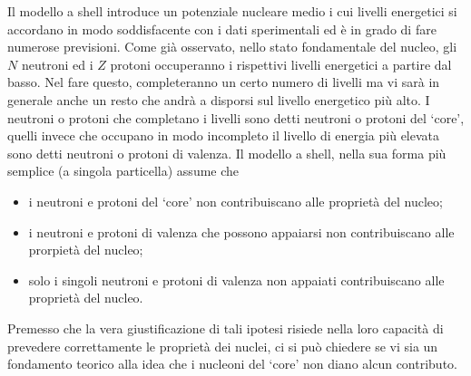 Il modello a shell introduce un potenziale nucleare medio i cui livelli energetici si accordano in modo soddisfacente con i dati sperimentali ed è in grado di fare numerose previsioni.
Come già osservato, nello stato fondamentale del nucleo, gli $N$ neutroni ed i $Z$ protoni occuperanno i rispettivi livelli energetici a partire dal basso. Nel fare questo, completeranno un certo numero di livelli ma vi sarà in generale anche un resto che andrà a disporsi sul livello energetico più alto. I neutroni o protoni che completano i livelli sono detti neutroni o protoni del ‘core’, quelli invece che occupano in modo incompleto il livello di energia più elevata sono detti neutroni o protoni di valenza.
Il modello a shell, nella sua forma più semplice (a singola particella) assume che
\begin{itemize}
	\item i neutroni e protoni del ‘core’ non contribuiscano alle proprietà del nucleo;
	\item i neutroni e protoni di valenza che possono appaiarsi non contribuiscano alle prorpietà del nucleo;
    \item solo i singoli neutroni e protoni di valenza non appaiati contribuiscano alle proprietà del nucleo.
\end{itemize}
Premesso che la vera giustificazione di tali ipotesi risiede nella loro capacità di prevedere correttamente le proprietà dei nuclei, ci si può chiedere se vi sia un fondamento teorico alla idea che i nucleoni del ‘core’ non diano alcun contributo.

